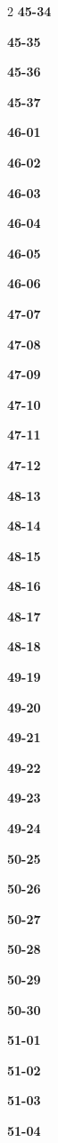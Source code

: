 \documentclass[10pt,a4paper]{article}
\begin{document}
\begin{multicols}{2}
\noindent\textbf{45-34}\ \par
\noindent\textbf{45-35}\ \par
\noindent\textbf{45-36}\ \par
\noindent\textbf{45-37}\ \par
\noindent\textbf{46-01}\ \par
\noindent\textbf{46-02}\ \par
\noindent\textbf{46-03}\ \par
\noindent\textbf{46-04}\ \par
\noindent\textbf{46-05}\ \par
\noindent\textbf{46-06}\ \par
\noindent\textbf{47-07}\ \par
\noindent\textbf{47-08}\ \par
\noindent\textbf{47-09}\ \par
\noindent\textbf{47-10}\ \par
\noindent\textbf{47-11}\ \par
\noindent\textbf{47-12}\ \par
\noindent\textbf{48-13}\ \par
\noindent\textbf{48-14}\ \par
\noindent\textbf{48-15}\ \par
\noindent\textbf{48-16}\ \par
\noindent\textbf{48-17}\ \par
\noindent\textbf{48-18}\ \par
\noindent\textbf{49-19}\ \par
\noindent\textbf{49-20}\ \par
\noindent\textbf{49-21}\ \par
\noindent\textbf{49-22}\ \par
\noindent\textbf{49-23}\ \par
\noindent\textbf{49-24}\ \par
\noindent\textbf{50-25}\ \par
\noindent\textbf{50-26}\ \par
\noindent\textbf{50-27}\ \par
\noindent\textbf{50-28}\ \par
\noindent\textbf{50-29}\ \par
\noindent\textbf{50-30}\ \par
\noindent\textbf{51-01}\ \par
\noindent\textbf{51-02}\ \par
\noindent\textbf{51-03}\ \par
\noindent\textbf{51-04}\ \par

\end{multicols}
\end{document}
